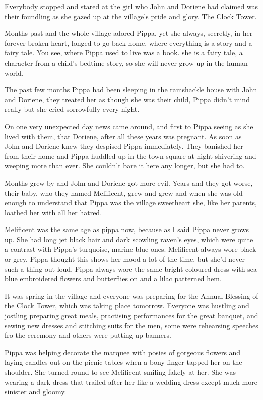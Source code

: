 Everybody stopped and stared at the girl who John and Doriene had
claimed was their foundling as she gazed up at the village's pride and
glory. The Clock Tower.

Months past and the whole village adored Pippa, yet she always,
secretly, in her forever broken heart, longed to go back home, where
everything is a story and a fairy tale. You see, where Pippa used to
live was a book. she is a fairy tale, a character from a child's bedtime
story, so she will never grow up in the human world.

The past few months Pippa had been sleeping in the ramshackle house with
John and Doriene, they treated her as though she was their child, Pippa
didn't mind really but she cried sorrowfully every night.

On one very unexpected day news came around, and first to Pippa seeing
as she lived with them, that Doriene, after all these years was
pregnant. As soon as John and Doriene knew they despised Pippa
immediately. They banished her from their home and Pippa huddled up in
the town square at night shivering and weeping more than ever. She
couldn't bare it here any longer, but she had to.

Months grew by and John and Doriene got more evil. Years and they got
worse, their baby, who they named Melificent, grew and grew and when she
was old enough to understand that Pippa was the village sweetheart she,
like her parents, loathed her with all her hatred.

Melificent was the same age as pippa now, because as I said Pippa never
grows up. She had long jet black hair and dark scowling raven's eyes,
which were quite a contrast with Pippa's turquoise, marine blue ones.
Melificent always wore black or grey. Pippa thought this shows her mood
a lot of the time, but she'd never such a thing out loud. Pippa always
wore the same bright coloured dress with sea blue embroidered flowers
and butterflies on and a lilac patterned hem.

It was spring in the village and everyone was preparing for the Annual
Blessing of the Clock Tower, which was taking place tomorrow. Everyone
was hustling and jostling preparing great meals, practising performances
for the great banquet, and sewing new dresses and stitching suits for
the men, some were rehearsing speeches fro the ceremony and others were
putting up banners.

Pippa was helping decorate the marquee with posies of gorgeous flowers
and laying candles out on the picnic tables when a bony finger tapped
her on the shoulder. She turned round to see Melificent smiling fakely
at her. She was wearing a dark dress that trailed after her like a
wedding dress except much more sinister and gloomy.

